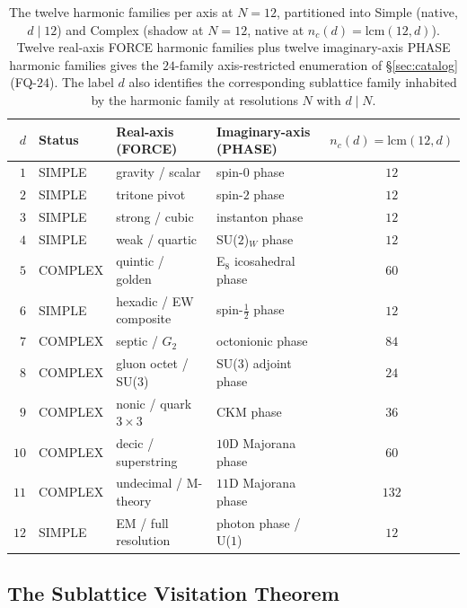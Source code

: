 \documentclass[11pt,a4paper]{article}
\theoremstyle{definition}
\theoremstyle{remark}
\begin{document}
\begin{table}[h]
\centering\small
\caption{The twelve harmonic families per axis at $N=12$, partitioned into Simple (native, $d \mid 12$) and Complex (shadow at $N=12$, native at $n_{c}(d)=\mathrm{lcm}(12,d)$). Twelve real-axis FORCE harmonic families plus twelve imaginary-axis PHASE harmonic families gives the $24$-family axis-restricted enumeration of \S\ref{sec:catalog} (FQ-$24$). The label $d$ also identifies the corresponding sublattice family inhabited by the harmonic family at resolutions $N$ with $d \mid N$.}
\label{tab:twelve-harmonic-families}
\begin{tabular}{@{}rl|llc@{}}
\toprule
$d$ & Status & Real-axis (FORCE) & Imaginary-axis (PHASE) & $n_{c}(d)=\mathrm{lcm}(12,d)$\\
\midrule
$1$  & SIMPLE  & gravity / scalar             & spin-$0$ phase                 & $12$  \\
$2$  & SIMPLE  & tritone pivot                & spin-$2$ phase                 & $12$  \\
$3$  & SIMPLE  & strong / cubic               & instanton phase                & $12$  \\
$4$  & SIMPLE  & weak / quartic               & SU($2$)$_{W}$ phase            & $12$  \\
$5$  & COMPLEX & quintic / golden             & E$_{8}$ icosahedral phase      & $60$  \\
$6$  & SIMPLE  & hexadic / EW composite       & spin-$\tfrac{1}{2}$ phase      & $12$  \\
$7$  & COMPLEX & septic / $G_{2}$             & octonionic phase               & $84$  \\
$8$  & COMPLEX & gluon octet / SU($3$)        & SU($3$) adjoint phase          & $24$  \\
$9$  & COMPLEX & nonic / quark $3\!\times\!3$ & CKM phase                      & $36$  \\
$10$ & COMPLEX & decic / superstring          & $10$D Majorana phase           & $60$  \\
$11$ & COMPLEX & undecimal / M-theory         & $11$D Majorana phase           & $132$ \\
$12$ & SIMPLE  & EM / full resolution         & photon phase / U($1$)          & $12$  \\
\bottomrule
\end{tabular}
\end{table}

\subsection{The Sublattice Visitation Theorem}\label{subsec:visitation}
\end{document}
